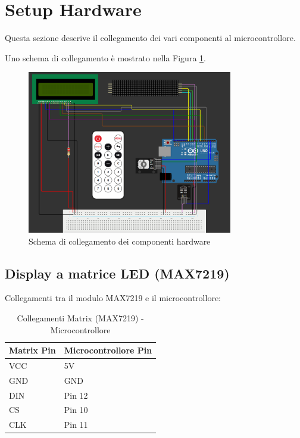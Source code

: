 \documentclass[a4paper, 12pt]{article}
\begin{document}
\section{Setup Hardware}
\label{sec:setup}
Questa sezione descrive il collegamento dei vari componenti al microcontrollore.

Uno schema di collegamento è mostrato nella Figura \ref{fig:setup-hardware-diagram}.
\begin{figure}[H]
    \centering
    \includegraphics[width=0.8\textwidth]{media/collegamenti.png}
    \caption{Schema di collegamento dei componenti hardware}
    \label{fig:setup-hardware-diagram}
\end{figure}

\subsection{Display a matrice LED (MAX7219)}
\label{subsec:setup-max7219}
Collegamenti tra il modulo MAX7219 e il microcontrollore:

\begin{table}[H]
    \centering
    \caption{Collegamenti Matrix (MAX7219) - Microcontrollore}
    \label{tab:matrix-max7219-connections}
    \begin{tabular}{ll}
        \toprule
        \textbf{Matrix Pin} & \textbf{Microcontrollore Pin} \\
        \midrule
        VCC                 & 5V                            \\
        GND                 & GND                           \\
        DIN                 & Pin 12                        \\
        CS                  & Pin 10                        \\
        CLK                 & Pin 11                        \\
        \bottomrule
    \end{tabular}
\end{table}
\end{document}
